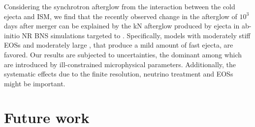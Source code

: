 Considering the synchrotron afterglow from the interaction between the cold  ejecta and 
\ac{ISM}, we find that the recently observed change in the afterglow of \GRB{} 
$10^3\,$days after merger can be explained by the \ac{kN} afterglow produced by ejecta in 
ab-initio \ac{NR} \ac{BNS} simulations targeted to \GW{}. 
%
Specifically, models with moderately stiff \acp{EOS} and moderately large \mr{}, 
that produce a mild amount of fast ejecta, are favored.
%
Our results are subjected to uncertainties, the dominant among which are introduced 
by ill-constrained microphysical parameters. 
Additionally, the systematic effects due to the finite resolution, neutrino treatment 
and \acp{EOS} might be important. 


\section*{Future work}

